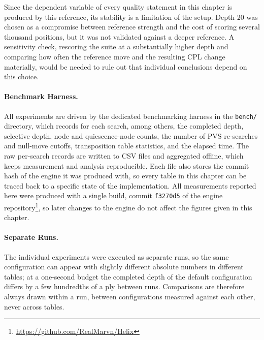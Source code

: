Since the dependent variable of every quality statement in this chapter is
produced by this reference, its stability is a limitation of the setup. Depth 20
was chosen as a compromise between reference strength and the cost of scoring
several thousand positions, but it was not validated against a deeper reference.
A sensitivity check, rescoring the suite at a substantially higher depth and
comparing how often the reference move and the resulting CPL change materially,
would be needed to rule out that individual conclusions depend on this choice.

\paragraph{Benchmark Harness.}
All experiments are driven by the dedicated benchmarking harness in the
\texttt{bench/} directory, which records for each search, among others, the
completed depth, selective depth, node and quiescence-node counts, the number of
PVS re-searches and null-move cutoffs, transposition table statistics, and the
elapsed time. The raw per-search records are written to CSV files and aggregated
offline, which keeps measurement and analysis reproducible. Each file also stores
the commit hash of the engine it was produced with, so every table in this
chapter can be traced back to a specific state of the implementation. All
measurements reported here were produced with a single build, commit
\texttt{f3270d5} of the engine repository\footnote{\url{https://github.com/RealMarvn/Helix}},
so later changes to the engine do not affect the figures given in this chapter.

\paragraph{Separate Runs.}
The individual experiments were executed as separate runs, so the same
configuration can appear with slightly different absolute numbers in different
tables; at a one-second budget the completed depth of the default configuration
differs by a few hundredths of a ply between runs. Comparisons are therefore
always drawn within a run, between configurations measured against each other,
never across tables.

